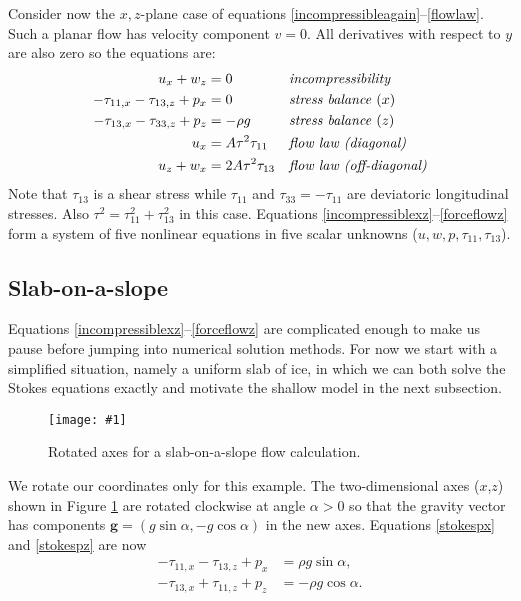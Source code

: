 \documentclass[letterpaper,final,12pt,reqno]{amsart}
\newcommand{\onefigsize}[3]{
\begin{figure}[ht]
\centering
\texttt{[image: \#1]}
\caption{#2}
\label{fig:#1}
\end{figure}}
\newcommand{\onefig}[2]{\onefigsize{#1}{#2}{3.0in}}
\begin{document}
Consider now the $x,z$-plane case of equations \eqref{incompressibleagain}--\eqref{flowlaw}.  Such a planar flow has velocity component $v=0$.  All derivatives with respect to $y$ are also zero so the equations are:
\begin{align}
u_x + w_z &= 0 &&\text{\emph{incompressibility}} \label{incompressiblexz} \\
- \tau_{11,x} - \tau_{13,z} + p_x &= 0 &&\text{\emph{stress balance} ($x$)} \label{stokespx} \\
- \tau_{13,x} - \tau_{33,z} + p_z &= - \rho g &&\text{\emph{stress balance} ($z$)} \label{stokespz} \\
u_x &= A \tau^2 \tau_{11} &&\text{\emph{flow law (diagonal)}}  \label{forceflowx} \\
u_z + w _x &= 2 A \tau^2 \tau_{13} &&\text{\emph{flow law (off-diagonal)}} \label{forceflowz}
\end{align}
Note that $\tau_{13}$ is a shear stress while $\tau_{11}$ and $\tau_{33}=-\tau_{11}$ are deviatoric longitudinal stresses.  Also $\tau^2 = \tau_{11}^2+\tau_{13}^2$ in this case.  Equations \eqref{incompressiblexz}--\eqref{forceflowz} form a system of five nonlinear equations in five scalar unknowns ($u,w,p,\tau_{11},\tau_{13}$).

\subsection*{Slab-on-a-slope}  Equations \eqref{incompressiblexz}--\eqref{forceflowz} are complicated enough to make us pause before jumping into numerical solution methods.  For now we start with a simplified situation, namely a uniform slab of ice, in which we can both solve the Stokes equations exactly and motivate the shallow model in the next subsection.

\onefig{slab}{Rotated axes for a slab-on-a-slope flow calculation.}

We rotate our coordinates only for this example.  The two-dimensional axes ($x$,$z$) shown in Figure \ref{fig:slab} are rotated clockwise at angle $\alpha>0$ so that the gravity vector has components $\mathbf{g} = (g \sin\alpha,- g \cos \alpha)$ in the new axes.  Equations \eqref{stokespx} and \eqref{stokespz} are now
\begin{align}
- \tau_{11,x} - \tau_{13,z} + p_x &= \rho g \sin\alpha, \label{stokespxrot} \\
- \tau_{13,x} + \tau_{11,z} + p_z &= - \rho g \cos\alpha. \label{stokespzrot}
\end{align}
\end{document}
